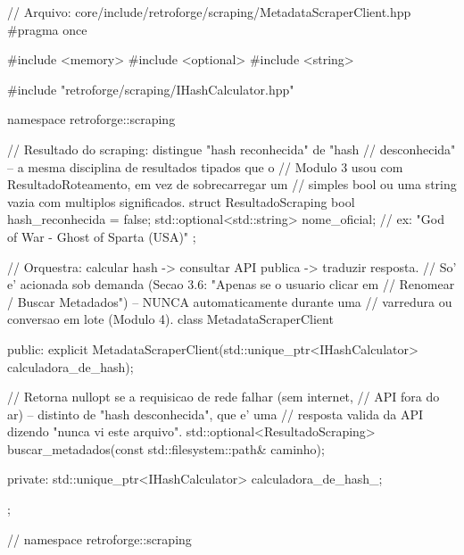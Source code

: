 \begin{CaixaCodigo}
// Arquivo: core/include/retroforge/scraping/MetadataScraperClient.hpp
#pragma once

#include <memory>
#include <optional>
#include <string>

#include "retroforge/scraping/IHashCalculator.hpp"

namespace retroforge::scraping {

// Resultado do scraping: distingue "hash reconhecida" de "hash
// desconhecida" -- a mesma disciplina de resultados tipados que o
// Modulo 3 usou com ResultadoRoteamento, em vez de sobrecarregar um
// simples bool ou uma string vazia com multiplos significados.
struct ResultadoScraping {
    bool hash_reconhecida = false;
    std::optional<std::string> nome_oficial; // ex: "God of War - Ghost of Sparta (USA)"
};

// Orquestra: calcular hash -> consultar API publica -> traduzir resposta.
// So' e' acionada sob demanda (Secao 3.6: "Apenas se o usuario clicar em
// Renomear / Buscar Metadados") -- NUNCA automaticamente durante uma
// varredura ou conversao em lote (Modulo 4).
class MetadataScraperClient {
public:
    explicit MetadataScraperClient(std::unique_ptr<IHashCalculator> calculadora_de_hash);

    // Retorna nullopt se a requisicao de rede falhar (sem internet,
    // API fora do ar) -- distinto de "hash desconhecida", que e' uma
    // resposta valida da API dizendo "nunca vi este arquivo".
    std::optional<ResultadoScraping> buscar_metadados(const std::filesystem::path& caminho);

private:
    std::unique_ptr<IHashCalculator> calculadora_de_hash_;
};

} // namespace retroforge::scraping
\end{CaixaCodigo}


